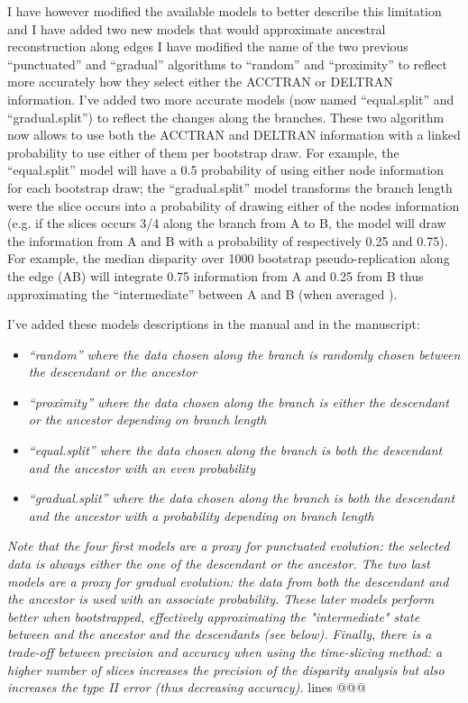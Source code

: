 \documentclass[12pt,letterpaper]{article}
\begin{document}
\begin{enumerate}
I have however modified the available models to better describe this limitation and I have added two new models that would approximate ancestral reconstruction along edges
I have modified the name of the two previous ``punctuated'' and ``gradual'' algorithms to ``random'' and ``proximity'' to reflect more accurately how they select either the ACCTRAN or DELTRAN information.
I've added two more accurate models (now named ``equal.split'' and ``gradual.split'') to reflect the changes along the branches.
These two algorithm now allows to use both the ACCTRAN and DELTRAN information with a linked probability to use either of them per bootstrap draw.
For example, the ``equal.split'' model will have a 0.5 probability of using either node information for each bootstrap draw; the ``gradual.split'' model transforms the branch length were the slice occurs into a probability of drawing either of the nodes information (e.g. if the slices occurs 3/4 along the branch from A to B, the model will draw the information from A and B with a probability of respectively 0.25 and 0.75).
For example, the median disparity over 1000 bootstrap pseudo-replication along the edge (AB) will integrate 0.75 information from A and 0.25 from B thus approximating the ``intermediate'' between A and B (when averaged ).

I've added these models descriptions in the manual and in the manuscript:

\begin{itemize}
    \item \textit{``random'' where the data chosen along the branch is randomly chosen between the descendant or the ancestor}
    \item \textit{``proximity'' where the data chosen along the branch is either the descendant or the ancestor depending on branch length}
    \item \textit{``equal.split'' where the data chosen along the branch is both the descendant and the ancestor with an even probability}
    \item \textit{``gradual.split'' where the data chosen along the branch is both the descendant and the ancestor with a probability depending on branch length}
\end{itemize}

\textit{Note that the four first models are a proxy for punctuated evolution: the selected data is always either the one of the descendant or the ancestor.
The two last models are a proxy for gradual evolution: the data from both the descendant and the ancestor is used with an associate probability.
These later models perform better when bootstrapped, effectively approximating the "intermediate" state between and the ancestor and the descendants (see below).
Finally, there is a trade-off between precision and accuracy when using the time-slicing method: a higher number of slices increases the precision of the disparity analysis but also increases the type II error (thus decreasing accuracy).} lines @@@


\end{enumerate}
\end{document}
